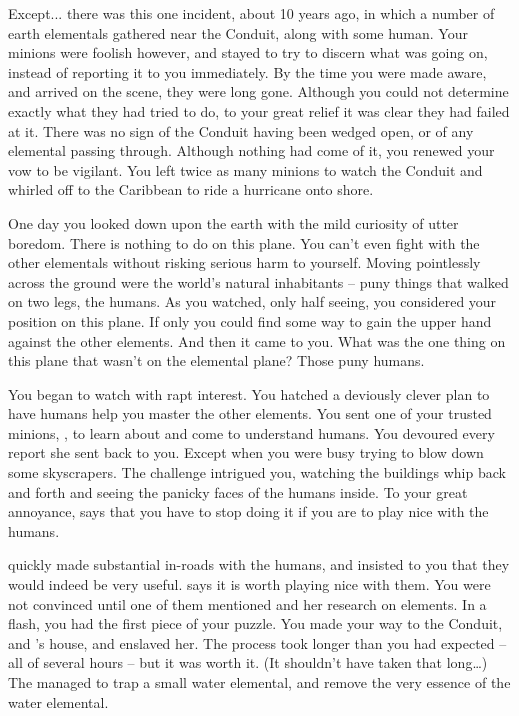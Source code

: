 \documentclass[char]{elementals}
\begin{document}
Except... there was this one incident, about 10 years ago, in which a number of earth elementals gathered near the Conduit, along with some human. Your minions were foolish however, and stayed to try to discern what was going on, instead of reporting it to you immediately. By the time you were made aware, and arrived on the scene, they were long gone. Although you could not determine exactly  what they had tried to do, to your great relief it was clear they had failed at it. There was no sign of the Conduit having been wedged open, or of any elemental passing through. Although nothing had come of it, you renewed your vow to be vigilant. You left twice as many minions to watch the Conduit and whirled off to the Caribbean to ride a hurricane onto shore.

One day you looked down upon the earth with the mild curiosity of utter boredom. There is nothing to do on this plane. You can't even fight with the other elementals without risking serious harm to yourself. Moving pointlessly across the ground were the world's natural inhabitants -- puny things that walked on two legs, the humans. As you watched, only half seeing, you considered your position on this plane. If only you could find some way to gain the upper hand against the other elements. And then it came to you. What was the one thing on this plane that wasn't on the elemental plane? Those puny humans.

You began to watch with rapt interest. You hatched a deviously clever plan to have humans help you master the other elements. You sent one of your trusted minions, \cNaturalist{\intro}, to learn about and come to understand humans. You devoured every report she sent back to you. Except when you were busy trying to blow down some skyscrapers. The challenge intrigued you, watching the buildings whip back and forth and seeing the panicky faces of the humans inside. To your great annoyance, \cNaturalist{} says that you have to stop doing it if you are to play nice with the humans.

\cNaturalist{} quickly made substantial in-roads with the humans, and insisted to you that they would indeed be very useful. \cNaturalist{\They} says it is worth playing nice with them. You were not convinced until one of them mentioned \cGD{\intro} and her research on elements. In a flash, you had the first piece of your puzzle. You made your way to the Conduit, and \cGD{}'s house, and enslaved her. The process took longer than you had expected -- all of several hours -- but it was worth it. (It shouldn't have taken that long{\ldots}) The \cGD{\kid} managed to trap a small water elemental, and  remove the very essence of the water elemental. 
\end{document}
